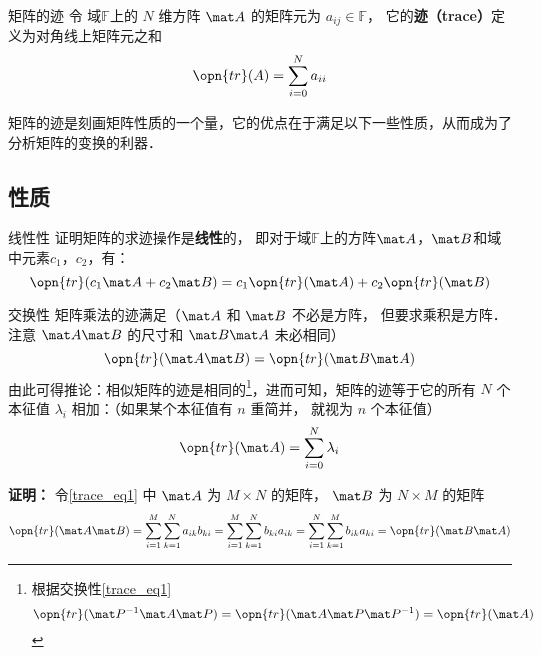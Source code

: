 


\begin{definition}{矩阵的迹}
令 域$\mathbb{F}$上的 $N$ 维方阵 $\mat A$ 的矩阵元为 $a_{ij}\in\mathbb{F}$， 它的\textbf{迹（trace）}定义为对角线上矩阵元之和
\begin{equation}
\opn{tr}(A) = \sum_{i=0}^N a_{ii}
\end{equation}
\end{definition}

矩阵的迹是刻画矩阵性质的一个量，它的优点在于满足以下一些性质，从而成为了分析矩阵的变换的利器．


\subsection{性质}


\begin{exercise}{线性性}
证明矩阵的求迹操作是\textbf{线性}的， 即对于域$\mathbb{F}$上的方阵$\mat A$，$\mat B$和域中元素$c_1$，$c_2$，有：
\begin{equation}
\opn{tr}(c_1\mat A+c_2\mat B) = c_1\opn{tr}(\mat A) + c_2\opn{tr}(\mat B)
\end{equation}
\end{exercise}

\begin{example}{交换性}
矩阵乘法的迹满足（$\mat A$ 和 $\mat B$ 不必是方阵， 但要求乘积是方阵． 注意 $\mat A\mat B$ 的尺寸和 $\mat B\mat A$ 未必相同）
\begin{equation}\label{trace_eq1}
\opn{tr}(\mat A\mat B) = \opn{tr}(\mat B\mat A)
\end{equation}
由此可得推论：相似矩阵的迹是相同的\footnote{根据交换性\autoref{trace_eq1} $$\opn{tr}(\mat P^{-1}\mat A\mat P) = \opn{tr}(\mat A\mat P\mat P^{-1}) = \opn{tr}(\mat A)$$}，进而可知，矩阵的迹等于它的所有 $N$ 个本征值 $\lambda_i$ 相加：（如果某个本征值有 $n$ 重简并， 就视为 $n$ 个本征值）
\begin{equation}
\opn{tr}(\mat A) = \sum_{i=0}^N \lambda_i
\end{equation}
\end{example}

\textbf{证明：}
令\autoref{trace_eq1} 中 $\mat A$ 为 $M\times N$ 的矩阵， $\mat B$ 为 $N\times M$ 的矩阵
\begin{equation}
\opn{tr}(\mat A\mat B) = \sum_{i=1}^M \sum_{k=1}^N a_{ik}b_{ki} = \sum_{i=1}^M \sum_{k=1}^N b_{ki}a_{ik} = \sum_{i=1}^N \sum_{k=1}^M b_{ik}a_{ki} = \opn{tr}(\mat B\mat A)
\end{equation}


